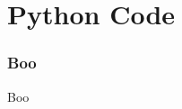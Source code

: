 \section{Python Code}

\begin{frame}
	\frametitle{Boo}
	Boo
\end{frame}
\endinput  %




%

%

%			


